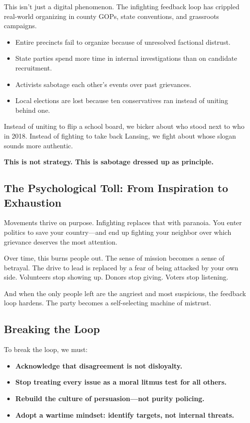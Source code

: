 This isn’t just a digital phenomenon. The infighting feedback loop has crippled real-world organizing in county GOPs, state conventions, and grassroots campaigns.

\begin{itemize}
    \item Entire precincts fail to organize because of unresolved factional distrust.
    \item State parties spend more time in internal investigations than on candidate recruitment.
    \item Activists sabotage each other’s events over past grievances.
    \item Local elections are lost because ten conservatives ran instead of uniting behind one.
\end{itemize}

Instead of uniting to flip a school board, we bicker about who stood next to who in 2018. Instead of fighting to take back Lansing, we fight about whose slogan sounds more authentic.

\textbf{This is not strategy. This is sabotage dressed up as principle.}

\subsection*{The Psychological Toll: From Inspiration to Exhaustion}

Movements thrive on purpose. Infighting replaces that with paranoia. You enter politics to save your country—and end up fighting your neighbor over which grievance deserves the most attention.

Over time, this burns people out. The sense of mission becomes a sense of betrayal. The drive to lead is replaced by a fear of being attacked by your own side. Volunteers stop showing up. Donors stop giving. Voters stop listening.

And when the only people left are the angriest and most suspicious, the feedback loop hardens. The party becomes a self-selecting machine of mistrust.

\subsection*{Breaking the Loop}

To break the loop, we must:
\begin{itemize}
    \item \textbf{Acknowledge that disagreement is not disloyalty.}
    \item \textbf{Stop treating every issue as a moral litmus test for all others.}
    \item \textbf{Rebuild the culture of persuasion—not purity policing.}
    \item \textbf{Adopt a wartime mindset: identify targets, not internal threats.}
\end{itemize}

